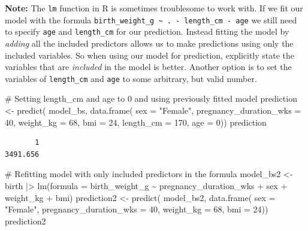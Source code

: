 \documentclass[
  letterpaper,
  DIV=11,
  numbers=noendperiod]{scrreprt}
\newenvironment{Shaded}{\begin{snugshade}}{\end{snugshade}}
\newcommand{\AttributeTok}[1]{\textcolor[rgb]{0.40,0.45,0.13}{#1}}
\newcommand{\CommentTok}[1]{\textcolor[rgb]{0.37,0.37,0.37}{#1}}
\newcommand{\DecValTok}[1]{\textcolor[rgb]{0.68,0.00,0.00}{#1}}
\newcommand{\FunctionTok}[1]{\textcolor[rgb]{0.28,0.35,0.67}{#1}}
\newcommand{\NormalTok}[1]{\textcolor[rgb]{0.00,0.23,0.31}{#1}}
\newcommand{\OtherTok}[1]{\textcolor[rgb]{0.00,0.23,0.31}{#1}}
\newcommand{\SpecialCharTok}[1]{\textcolor[rgb]{0.37,0.37,0.37}{#1}}
\newcommand{\StringTok}[1]{\textcolor[rgb]{0.13,0.47,0.30}{#1}}
\begin{document}
\textbf{Note:} The \texttt{lm} function in R is sometimes troublesome to
work with. If we fit our model with the formula
\texttt{birth\_weight\_g\ \textasciitilde{}\ .\ -\ length\_cm\ -\ age}
we still need to specify \texttt{age} and \texttt{length\_cm} for our
prediction. Instead fitting the model by \emph{adding} all the included
predictors allows us to make predictions using only the included
variables. So when using our model for prediction, explicitly state the
variables that are \emph{included} in the model is better. Another
option is to set the variables of \texttt{length\_cm} and \texttt{age}
to some arbitrary, but valid number.

\begin{Shaded}
\begin{Highlighting}[]
\CommentTok{\# Setting length\_cm and age to 0 and using previously fitted model}
\NormalTok{prediction }\OtherTok{\textless{}{-}} \FunctionTok{predict}\NormalTok{(}
\NormalTok{  model\_bs, }
  \FunctionTok{data.frame}\NormalTok{(}
    \AttributeTok{sex =} \StringTok{"Female"}\NormalTok{, }
    \AttributeTok{pregnancy\_duration\_wks =} \DecValTok{40}\NormalTok{, }
    \AttributeTok{weight\_kg =} \DecValTok{68}\NormalTok{, }
    \AttributeTok{bmi =} \DecValTok{24}\NormalTok{, }
    \AttributeTok{length\_cm =} \DecValTok{170}\NormalTok{, }
    \AttributeTok{age =} \DecValTok{0}\NormalTok{))}
\NormalTok{prediction}
\end{Highlighting}
\end{Shaded}

\begin{verbatim}
       1 
3491.656 
\end{verbatim}

\begin{Shaded}
\begin{Highlighting}[]
\CommentTok{\# Refitting model with only included predictors in the formula}
\NormalTok{model\_bs2 }\OtherTok{\textless{}{-}}\NormalTok{ birth }\SpecialCharTok{|\textgreater{}} \FunctionTok{lm}\NormalTok{(}\AttributeTok{formula =}\NormalTok{ birth\_weight\_g }\SpecialCharTok{\textasciitilde{}}\NormalTok{ pregnancy\_duration\_wks }\SpecialCharTok{+}\NormalTok{ sex }\SpecialCharTok{+}\NormalTok{ weight\_kg }\SpecialCharTok{+}\NormalTok{ bmi)}
\NormalTok{prediction2 }\OtherTok{\textless{}{-}} \FunctionTok{predict}\NormalTok{(}
\NormalTok{  model\_bs2, }
  \FunctionTok{data.frame}\NormalTok{(}
    \AttributeTok{sex =} \StringTok{"Female"}\NormalTok{, }
    \AttributeTok{pregnancy\_duration\_wks =} \DecValTok{40}\NormalTok{, }
    \AttributeTok{weight\_kg =} \DecValTok{68}\NormalTok{, }
    \AttributeTok{bmi =} \DecValTok{24}\NormalTok{))}
\NormalTok{prediction2}
\end{Highlighting}
\end{Shaded}
\end{document}
